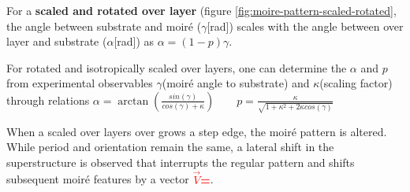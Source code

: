 	For a \textbf{scaled and rotated over layer} (figure \ref{fig:moire-pattern-scaled-rotated}, the angle between substrate and moir\'e ($\gamma$[rad]) scales with the angle between over layer and substrate ($\alpha$[rad]) as $\alpha=(1-p)\gamma$.
	
	For rotated and isotropically scaled over layers, one can determine the $\alpha$ and $p$ from experimental observables $\gamma$(moir\'e angle to substrate) and $\kappa$(scaling factor) through relations $ \alpha=\arctan \left ( \frac{sin(\gamma)}{cos(\gamma)+\kappa} \right )\qquad p=\frac{\kappa}{\sqrt{1+\kappa^2+2\kappa cos(\gamma)}}$
	
	
	
	When a scaled over layers over grows a step edge, the moir\'e pattern is altered. While period and orientation remain the same, a lateral shift in the superstructure is observed that interrupts the regular pattern and shifts subsequent moir\'e features by a vector \textcolor{red}{\textbf{$\vec{V}$=}}.
	


